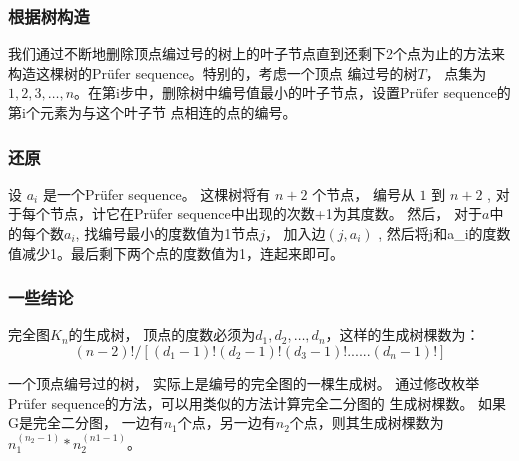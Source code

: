 \subsubsection{根据树构造}
我们通过不断地删除顶点编过号的树上的叶子节点直到还剩下2个点为止的方法来构造这棵树的Prüfer sequence。特别的，考虑一个顶点
编过号的树$T$， 点集为$ { 1, 2, 3, \ldots , n} $。在第i步中，删除树中编号值最小的叶子节点，设置Prüfer sequence的第i个元素为与这个叶子节
点相连的点的编号。

\subsubsection{还原}
设 $a_i$ 是一个Prüfer sequence。
这棵树将有 $n + 2$ 个节点， 编号从 $1$ 到 $n + 2$ , 对于每个节点，计它在Prüfer sequence中出现的次数+1为其度数。
然后， 对于$a$中的每个数$a_i$, 找编号最小的度数值为1节点$j$， 加入边$(j,a_i)$ , 然后将j和a_i的度数值减少1。最后剩下两个点的度数值为1，连起来即可。

\subsubsection{一些结论}
完全图$K_n$的生成树， 顶点的度数必须为$d_1, d_2, \ldots, d_n$，这样的生成树棵数为：
$$(n-2)! / [(d_1 - 1)! (d_2 - 1)! (d_3 - 1)! ...... (d_n - 1)!]$$

一个顶点编号过的树， 实际上是编号的完全图的一棵生成树。 通过修改枚举Prüfer sequence的方法，可以用类似的方法计算完全二分图的
生成树棵数。 如果G是完全二分图， 一边有$n_1$个点，另一边有$n_2$个点，则其生成树棵数为 $n_1 ^ (n_2 - 1) * n_2 ^ (n1 - 1)$。
